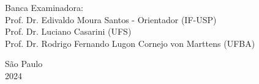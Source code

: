 \begin{titlepage}

\noindent Banca Examinadora: \\
\noindent Prof. Dr. Edivaldo Moura Santos - Orientador (IF-USP) \\
Prof. Dr. Luciano Casarini (UFS) \\
Prof. Dr. Rodrigo Fernando Lugon Cornejo von Marttens (UFBA) \\
\vspace{2.8cm}


\centering
    {São Paulo \\  2024}
\clearpage
\end{titlepage}

